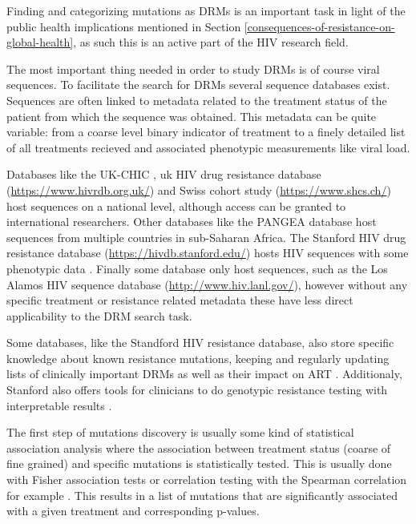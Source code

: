 \documentclass[
  11pt,
  twoside]{scrbook}
\begin{document}
Finding and categorizing mutations as DRMs is an important task in light of the public health implications mentioned in Section \ref{consequences-of-resistance-on-global-health}, as such this is an active part of the HIV research field.

The most important thing needed in order to study DRMs is of course viral sequences. To facilitate the search for DRMs several sequence databases exist. Sequences are often linked to metadata related to the treatment status of the patient from which the sequence was obtained. This metadata can be quite variable: from a coarse level binary indicator of treatment to a finely detailed list of all treatments recieved and associated phenotypic measurements like viral load.

Databases like the UK-CHIC \autocite{ukchicsteeringcommitteeCreationLargeUKbased2004}, uk HIV drug resistance database (\url{https://www.hivrdb.org.uk/}) and Swiss cohort study (\url{https://www.shcs.ch/}) host sequences on a national level, although access can be granted to international researchers. Other databases like the PANGEA database \autocite{abeler-dornerPANGEAHIVPhylogeneticsNetworks2019} host sequences from multiple countries in sub-Saharan Africa. The Stanford HIV drug resistance database (\url{https://hivdb.stanford.edu/}) hosts HIV sequences with some phenotypic data \autocite{rheeHumanImmunodeficiencyVirus2003,shaferRationaleUsesPublic2006}. Finally some database only host sequences, such as the Los Alamos HIV sequence database (\url{http://www.hiv.lanl.gov/}), however without any specific treatment or resistance related metadata \autocite{kuikenHIVSequenceDatabases2003} these have less direct applicability to the DRM search task.

Some databases, like the Standford HIV resistance database, also store specific knowledge about known resistance mutations, keeping and regularly updating lists of clinically important DRMs as well as their impact on ART \autocite{wensing2019UpdateDrug2019,clarkMutationsRetroviralGenes2007}. Additionaly, Stanford also offers tools for clinicians to do genotypic resistance testing with interpretable results \autocite{liuWebResourcesHIV2006d}.

The first step of mutations discovery is usually some kind of statistical association analysis\autocite{johnsonUpdateDrugResistance2016,wensing2019UpdateDrug2019} where the association between treatment status (coarse of fine grained) and specific mutations is statistically tested. This is usually done with Fisher association tests \autocite{villabona-arenasIndepthAnalysisHIV12016,shulmanGeneticCorrelatesEfavirenz2004} or correlation testing with the Spearman correlation for example \autocite{millerGenotypicPhenotypicPredictors2004}. This results in a list of mutations that are significantly associated with a given treatment and corresponding p-values.
\end{document}
